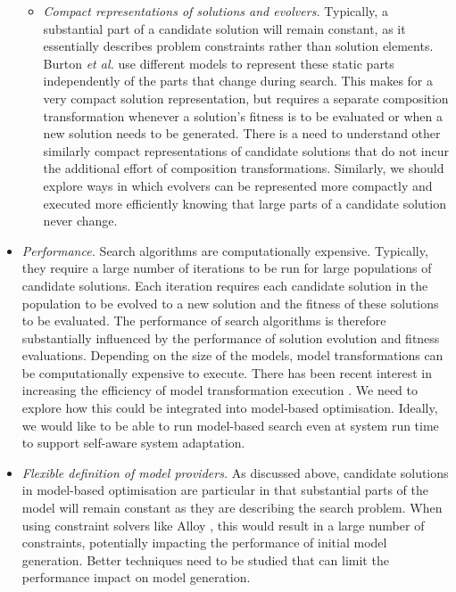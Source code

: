 \begin{itemize}
\begin{itemize}
						\item \emph{Compact representations of solutions and evolvers.} Typically, a substantial part of a candidate solution will remain constant, as it essentially describes problem
						      constraints rather than solution elements. Burton \emph{et al.} \cite{Burton+12} use different models to represent these static parts independently of the parts that change during
									search. This makes for a very compact solution representation, but requires a separate composition transformation whenever a solution's fitness is to be evaluated or when a new
									solution needs to be generated. There is a need to understand other similarly compact representations of candidate solutions that do not incur the additional effort of composition
									transformations. Similarly, we should explore ways in which evolvers can be represented more compactly and executed more efficiently knowing that large parts of a candidate
									solution never change.
					\end{itemize}

		\item \emph{Performance.} Search algorithms are computationally expensive. Typically, they require a large number of iterations to be run for large populations
		      of candidate solutions. Each iteration requires each candidate solution in the population to be evolved to a new solution and the fitness of these
					solutions to be evaluated. The performance of search algorithms is therefore substantially influenced by the performance of solution evolution and
					fitness evaluations. Depending on the size of the models, model transformations can be computationally expensive to execute. There has been recent
					interest in increasing the efficiency of model transformation execution \cite{Amstel+11,Meszaros2010}. We need to explore how this could be integrated into
					model-based optimisation. Ideally, we would like to be able to run model-based search even at system run time to support self-aware system adaptation.

		\item \emph{Flexible definition of model providers.} As discussed above, candidate solutions in model-based optimisation are particular in that substantial
		      parts of the model will remain constant as they are describing the search problem. When using constraint solvers like Alloy \cite{Jackson02}, this
					would result in a large number of constraints, potentially impacting the performance of initial model generation. Better techniques need to be studied
					that can limit the performance impact on model generation.


\end{itemize}
